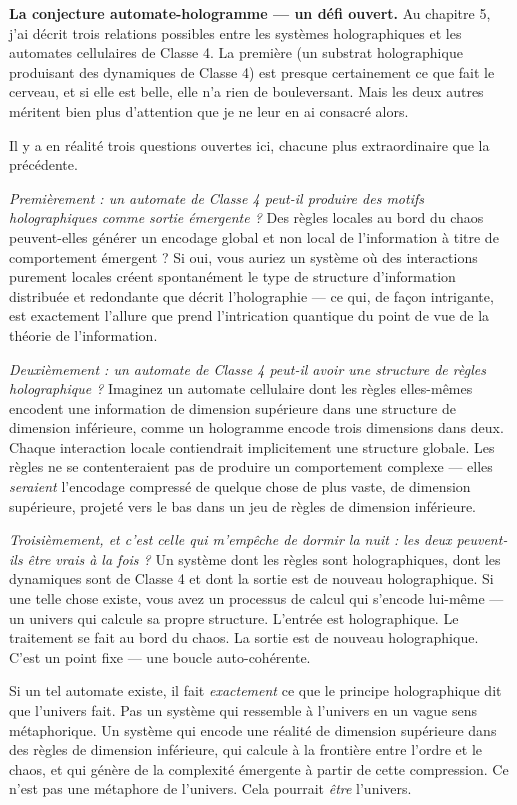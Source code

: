 \documentclass[11pt, twoside, openright]{book}
\begin{document}
\textbf{La conjecture automate-hologramme --- un défi ouvert.} Au chapitre 5, j'ai décrit trois relations possibles entre les systèmes holographiques et les automates cellulaires de Classe 4. La première (un substrat holographique produisant des dynamiques de Classe 4) est presque certainement ce que fait le cerveau, et si elle est belle, elle n'a rien de bouleversant. Mais les deux autres méritent bien plus d'attention que je ne leur en ai consacré alors.

Il y a en réalité trois questions ouvertes ici, chacune plus extraordinaire que la précédente.

\textit{Premièrement : un automate de Classe 4 peut-il produire des motifs holographiques comme sortie émergente ?} Des règles locales au bord du chaos peuvent-elles générer un encodage global et non local de l'information à titre de comportement émergent ? Si oui, vous auriez un système où des interactions purement locales créent spontanément le type de structure d'information distribuée et redondante que décrit l'holographie --- ce qui, de façon intrigante, est exactement l'allure que prend l'intrication quantique du point de vue de la théorie de l'information.

\textit{Deuxièmement : un automate de Classe 4 peut-il avoir une structure de règles holographique ?} Imaginez un automate cellulaire dont les règles elles-mêmes encodent une information de dimension supérieure dans une structure de dimension inférieure, comme un hologramme encode trois dimensions dans deux. Chaque interaction locale contiendrait implicitement une structure globale. Les règles ne se contenteraient pas de produire un comportement complexe --- elles \textit{seraient} l'encodage compressé de quelque chose de plus vaste, de dimension supérieure, projeté vers le bas dans un jeu de règles de dimension inférieure.

\textit{Troisièmement, et c'est celle qui m'empêche de dormir la nuit : les deux peuvent-ils être vrais à la fois ?} Un système dont les règles sont holographiques, dont les dynamiques sont de Classe 4 et dont la sortie est de nouveau holographique. Si une telle chose existe, vous avez un processus de calcul qui s'encode lui-même --- un univers qui calcule sa propre structure. L'entrée est holographique. Le traitement se fait au bord du chaos. La sortie est de nouveau holographique. C'est un point fixe --- une boucle auto-cohérente.

Si un tel automate existe, il fait \textit{exactement} ce que le principe holographique dit que l'univers fait. Pas un système qui ressemble à l'univers en un vague sens métaphorique. Un système qui encode une réalité de dimension supérieure dans des règles de dimension inférieure, qui calcule à la frontière entre l'ordre et le chaos, et qui génère de la complexité émergente à partir de cette compression. Ce n'est pas une métaphore de l'univers. Cela pourrait \textit{être} l'univers.
\end{document}
